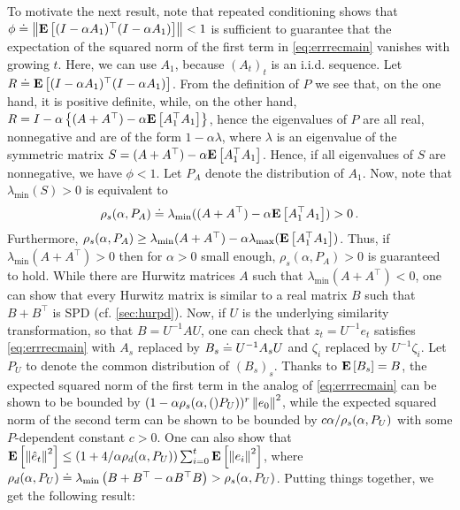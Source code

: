 \iffalse
From \eqref{eq:errrecmain}, it is clear that the magnitude of $\hat e_t$ is governed by the behavior
of the products $\Pi_{s=i+1}^{t}(I-\alpha A_s)$, $j=0,\dots,t$. 
Here, we will perform some crude upper bounding and derive simple sufficient conditions that guarantee that on expectation these product matrices are ``small''. However, we will show that the error bounds derived are tight in a worst-case sense.
\fi

To motivate the next result, note that repeated conditioning shows that
$\phi \doteq \left\|  \mathbf{E}\left[ (I-\alpha A_1)^\top (I-\alpha A_1)\right] \right\|<1$ is sufficient 
 to guarantee that the expectation of the squared norm of the
 first term in \eqref{eq:errrecmain} vanishes with growing $t$.
Here, we can use $A_1$, because $(A_t)_t$ is an i.i.d. sequence.
Let $R \doteq \mathbf{E}\left[ (I-\alpha A_1)^\top (I-\alpha A_1)\right]$.
From the definition of $P$ we see that, on the one hand, it is positive
definite, while, on the other hand,
$R= I - \alpha \left\{(A+A^\top) -\alpha \mathbf{E}\left[A_1^\top A_1\right]\right\}$,
hence the eigenvalues of $P$ are all real, nonnegative
and are of the form $1-\alpha \lambda$,
where $\lambda$ is an eigenvalue of the symmetric matrix 
$S = (A+A^\top) -\alpha \mathbf{E}\left[A_1^\top A_1\right]$.
Hence, if all eigenvalues of $S$ are nonnegative, we have
$\phi<1$. 
Let $P_A$ denote the distribution of $A_1$.
Now, note that $\lambda_{\min}(S)>0$ is equivalent to
\begin{align*}
\rho_s(\alpha,P_A) \doteq \lambda_{\min} ((A+A^\top) -\alpha \mathbf{E}\left[A_1^\top A_1\right] )>0\,.
\end{align*}
Furthermore, 
$\rho_s(\alpha,P_A) \ge \lambda_{\min}( A+A^\top ) - \alpha \lambda_{\max} (\mathbf{E}\left[ A_1^\top A_1\right])$. Thus, if $\lambda_{\min}(A+A^\top)>0$ then for $\alpha>0$ small enough, $\rho_s(\alpha,P_A)>0$ is guaranteed to hold. While there are Hurwitz matrices $A$ such that $\lambda_{\min}(A+A^\top)<0$, one can show that every Hurwitz matrix is similar to a real matrix $B$ such that $B+B^\top$ is SPD (cf. \cref{sec:hurpd}). Now, if $U$ is the underlying similarity transformation, so that $B=U^{-1} A U$, one can check that $z_t = U^{-1} e_t$ satisfies \eqref{eq:errrecmain} with $A_s$ replaced by $B_s \doteq U^{-1} A_s U$ and $\zeta_i$ replaced by $U^{-1} \zeta_i$. Let $P_U$ to denote the common distribution of $(B_s)_s$.
Thanks to $\mathbf{E}\left[B_s\right] = B$, the expected squared norm of the first term in the analog of  \eqref{eq:errrecmain} can be shown to be bounded by $(1-\alpha \rho_s(\alpha,()P_U))^r \left\| e_0\right\|^2$, 
while the expected squared norm of the second term can be shown to be bounded by $c \alpha /\rho_s(\alpha,P_U)$ with some $P$-dependent constant $c>0$. One can also show that $\mathbf{E}\left[\left\| \hat e_t\right\|^2\right]\le (1+4/\alpha \rho_d(\alpha,P_U)) \sum_{i=0}^t \mathbf{E}\left[ \left\| e_i\right\|^2 \right]$, where $\rho_d(\alpha,P_U) \doteq \lambda_{\min}\left(B+B^\top - \alpha B^\top B\right)>\rho_s(\alpha,P_U)$. Putting things together, we get the following result:
